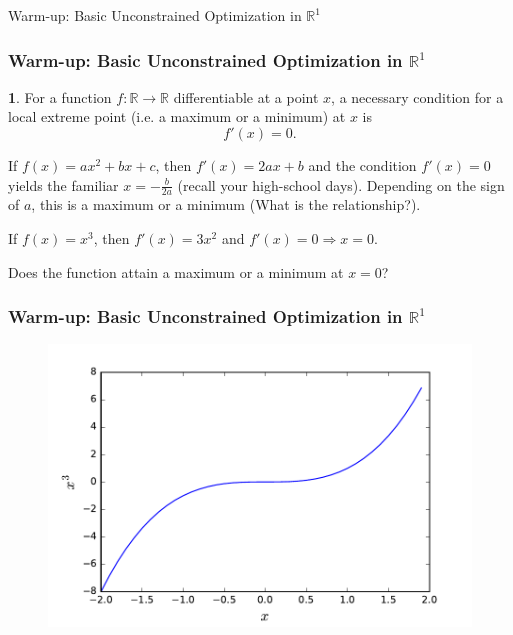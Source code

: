 \documentclass[10pt]{beamer}
\theoremstyle{definition}
\newtheorem{Fact}{\translate{Fact}}
\begin{document}
\begin{section}{Warm-up: Basic Unconstrained Optimization in $ \mathbb{R}^1 $}\label{sec:R1}

\begin{frame}[fragile]
\frametitle{Warm-up: Basic Unconstrained Optimization in $ \mathbb{R}^1 $}

\begin{Fact}
For a function $ f: \mathbb{R} \rightarrow \mathbb{R} $ differentiable at a point $ x $, a necessary condition for a local extreme point (i.e. a maximum or a minimum) at $ x $ is \[ f'(x) = 0. \]
\end{Fact}
\bigskip

\begin{example} %
If $ f(x) = ax^2 + bx + c $, then $ f'(x) = 2ax + b $ and the condition $ f'(x)=0 $ yields the familiar $ x=-\frac{b}{2a} $ (recall your high-school days). Depending on the sign of $ a $, this is a maximum or a minimum (What is the relationship?).
\end{example}\bigskip

\begin{example} %
If $ f(x) = x^3 $, then $ f'(x)=3x^2 $ and $ f'(x)=0 \Rightarrow x=0$.

Does the function attain a maximum or a minimum at $ x=0 $?
\end{example}
\end{frame}

\begin{frame}[fragile]
\frametitle{Warm-up: Basic Unconstrained Optimization in $ \mathbb{R}^1 $}
\begin{figure}
\centering
\includegraphics[width=0.9\linewidth]{cubicfun}
\label{fig:cubicfun}
\end{figure}
\end{frame}


\end{section}
\end{document}
